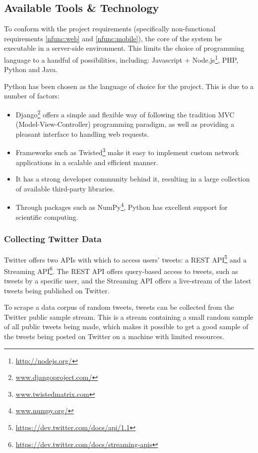 \documentclass[12pt,a4paper]{article}
\begin{document}
\subsection{Available Tools \& Technology}

To conform with the project requirements (specifically non-functional requirements \ref{nfunc:web} and \ref{nfunc:mobile}), the core of the system be executable in a server-side environment. This limits the choice of programming language to a handful of possibilities, including: Javascript + Node.js\footnote{\url{http://nodejs.org/}}, PHP, Python and Java.

Python has been chosen as the language of choice for the project. This is due to a number of factors:
\begin{itemize}
    \item Django\footnote{\url{www.djangoproject.com/}} offers a simple and flexible way of following the tradition MVC (Model-View-Controller) programming paradigm, as well as providing a pleasant interface to handling web requests.
    \item Frameworks such as Twisted\footnote{\url{www.twistedmatrix.com}} make it easy to implement custom network applications in a scalable and efficient manner.
    \item It has a strong developer community behind it, resulting in a large collection of available third-party libraries.
    \item Through packages such as NumPy\footnote{\url{www.numpy.org/}}, Python has excellent support for scientific computing.
\end{itemize}

\subsubsection{Collecting Twitter Data}
Twitter offers two APIs with which to access users' tweets: a REST API\footnote{\url{https://dev.twitter.com/docs/api/1.1}} and a Streaming API\footnote{\url{https://dev.twitter.com/docs/streaming-apis}}. The REST API offers query-based access to tweets, such as tweets by a specific user, and the Streaming API offers a live-stream of the latest tweets being published on Twitter.

To scrape a data corpus of random tweets, tweets can be collected from the Twitter public sample stream. This is a stream containing a small random sample of all public tweets being made, which makes it possible to get a good sample of the tweets being posted on Twitter on a machine with limited resources.
\end{document}

